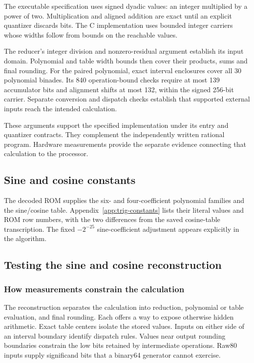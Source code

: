 \documentclass[11pt]{article}
\begin{document}
The executable specification uses signed dyadic values: an integer multiplied
by a power of two. Multiplication and aligned addition are exact until an
explicit quantizer discards bits. The C implementation uses bounded integer
carriers whose widths follow from bounds on the reachable values.

The reducer's integer division and nonzero-residual argument establish its
input domain. Polynomial and table width bounds then cover their products,
sums and final rounding. For the paired polynomial, exact interval enclosures
cover all 30 polynomial binades. Its 840 operation-bound checks require at
most 139 accumulator bits and alignment shifts at most 132, within the
signed 256-bit carrier. Separate conversion and dispatch checks establish
that supported external inputs reach the intended calculation.

These arguments support the specified implementation under its entry and
quantizer contracts. They complement the independently written rational
program. Hardware measurements provide the separate evidence connecting
that calculation to the processor.

\subsection{Sine and cosine constants}
\label{sec:trig-constants}

The decoded ROM supplies the six- and four-coefficient polynomial families
and the sine/cosine table. Appendix~\ref{app:trig-constants} lists their
literal values and ROM row numbers, with the two differences from the saved
cosine-table transcription. The fixed $-2^{-25}$ sine-coefficient adjustment
appears explicitly in the algorithm.

\subsection{Testing the sine and cosine reconstruction}
\label{sec:validation}

\subsubsection{How measurements constrain the calculation}

The reconstruction separates the calculation into reduction, polynomial or
table evaluation, and final rounding. Each offers a way to expose otherwise
hidden arithmetic. Exact table centers isolate the stored values. Inputs on
either side of an interval boundary identify dispatch rules. Values near
output rounding boundaries constrain the low bits retained by intermediate
operations. Raw80 inputs supply significand bits that a binary64 generator
cannot exercise.
\end{document}
